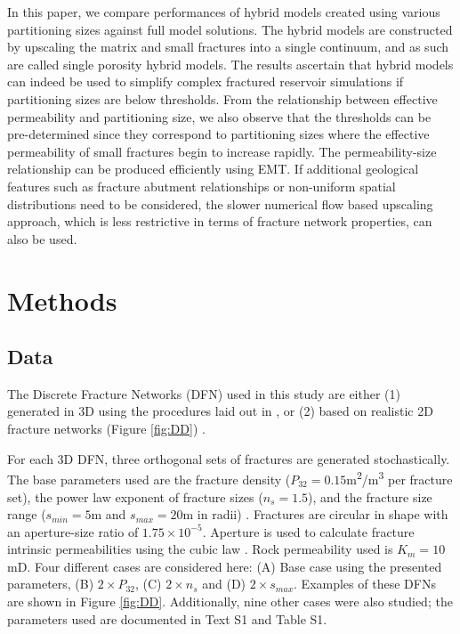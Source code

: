 \documentclass[draft]{agujournal2018}
\begin{document}
In this paper, we compare performances of hybrid models created using various partitioning sizes against full model solutions. The hybrid models are constructed by upscaling the matrix and small fractures into a single continuum, and as such are called single porosity hybrid models. The results ascertain that hybrid models can indeed be used to simplify complex fractured reservoir simulations if partitioning sizes are below thresholds. From the relationship between effective permeability and partitioning size, we also observe that the thresholds can be pre-determined since they correspond to partitioning sizes where the effective permeability of small fractures begin to increase rapidly. The permeability-size relationship can be produced efficiently using EMT. If additional geological features such as fracture abutment relationships or non-uniform spatial distributions need to be considered, the slower numerical flow based upscaling approach, which is less restrictive in terms of fracture network properties, can also be used.

\section{Methods}

\subsection{Data}
The Discrete Fracture Networks (DFN) used in this study are either (1) generated in 3D using the procedures laid out in \citet{Priest1993}, or (2) based on realistic 2D fracture networks (Figure \ref{fig:DD}) \citep{Bisdom2017}.

For each 3D DFN, three orthogonal sets of fractures are generated stochastically. The base parameters used are the fracture density ($P_{32}=0.15$m\textsuperscript{2}/m\textsuperscript{3} per fracture set), the power law exponent of fracture sizes ($n_s=1.5$), and the fracture size range ($s_{min}=5$m and $s_{max}=20$m in radii) \citep{Bonnet2001, Dershowitz1992}. Fractures are circular in shape with an aperture-size ratio of $1.75\times 10^{-5}$. Aperture is used to calculate fracture intrinsic permeabilities using the cubic law \citep{Witherspoon1980}. Rock permeability used is $K_m=10$mD. Four different cases are considered here: (A) Base case using the presented parameters, (B) $2\times P_{32}$, (C) $2\times n_s$ and (D) $2\times s_{max}$. Examples of these DFNs are shown in Figure \ref{fig:DD}. Additionally, nine other cases were also studied; the parameters used are documented in Text S1 and Table S1.
\end{document}
